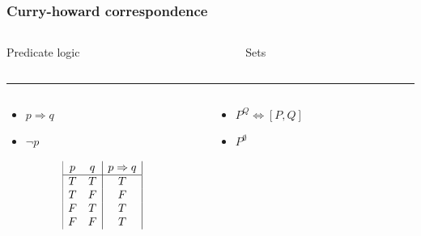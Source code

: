 \documentclass{beamer}
\begin{document}
\begin{frame}
    \frametitle{Curry-howard correspondence}
    \begin{columns}[T]
        \begin{column}{.48\textwidth}
        Predicate logic
        \end{column}
        \hfill
        \begin{column}{.48\textwidth}
        Sets
        \end{column}
    \end{columns}
    \color{black}\rule{\linewidth}{1pt}
    \begin{columns}[T]
        \begin{column}{.48\textwidth}
            \begin{itemize}
                \item $ p \Rightarrow q $ \\
                \item $ \neg p $
            \end{itemize}
            \begin{displaymath}
                \begin{array}{|c c|c|}
                    p & q & p \Rightarrow q \\
                    \hline
                    T & T & T \\
                    T & F & F \\
                    F & T & T \\
                    F & F & T \\
                \end{array}
            \end{displaymath}
        \end{column}
        \hfill
        \begin{column}{.48\textwidth}
            \begin{itemize}
                \item $ P^{Q} \Leftrightarrow [ P, Q ]$ \\
                \item $ P^{\emptyset} $ \\
            \end{itemize}
        \end{column}
    \end{columns}
\end{frame}
\end{document}
